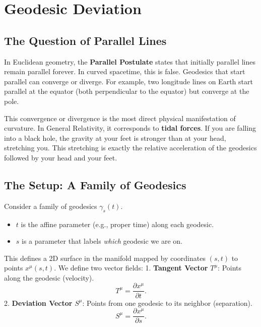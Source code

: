 \documentclass[11pt, a4paper]{report}
\begin{document}
\section{Geodesic Deviation}

\subsection*{The Question of Parallel Lines}
In Euclidean geometry, the \textbf{Parallel Postulate} states that initially parallel lines remain parallel forever. In curved spacetime, this is false. Geodesics that start parallel can converge or diverge. For example, two longitude lines on Earth start parallel at the equator (both perpendicular to the equator) but converge at the pole.

This convergence or divergence is the most direct physical manifestation of curvature. In General Relativity, it corresponds to \textbf{tidal forces}. If you are falling into a black hole, the gravity at your feet is stronger than at your head, stretching you. This stretching is exactly the relative acceleration of the geodesics followed by your head and your feet.

\subsection*{The Setup: A Family of Geodesics}
Consider a family of geodesics \(\gamma_s(t)\).
\begin{itemize}
    \item \(t\) is the affine parameter (e.g., proper time) along each geodesic.
    \item \(s\) is a parameter that labels \textit{which} geodesic we are on.
\end{itemize}
This defines a 2D surface in the manifold mapped by coordinates \((s, t)\) to points \(x^\mu(s, t)\).
We define two vector fields:
1.  \textbf{Tangent Vector} \(T^\mu\): Points along the geodesic (velocity).
    \begin{equation}
    T^\mu = \frac{\partial x^\mu}{\partial t}.
    \end{equation}
2.  \textbf{Deviation Vector} \(S^\mu\): Points from one geodesic to its neighbor (separation).
    \begin{equation}
    S^\mu = \frac{\partial x^\mu}{\partial s}.
    \end{equation}
\end{document}
